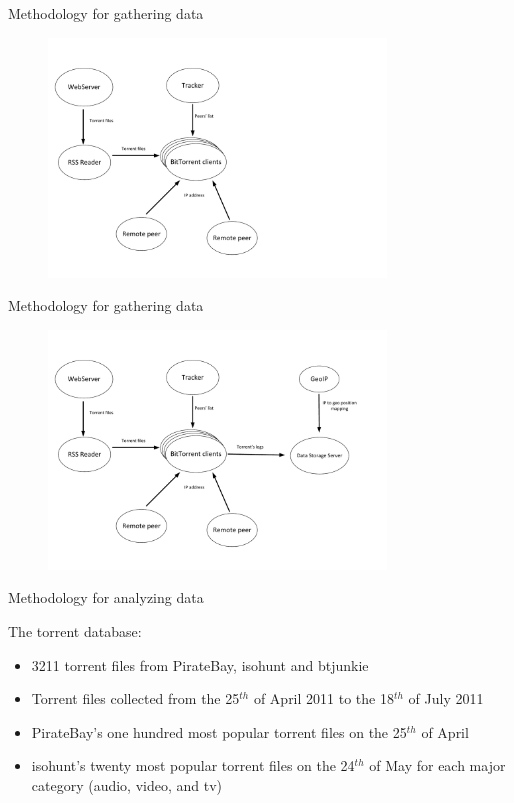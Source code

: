 \documentclass{beamer}
\begin{document}
\begin{frame}{Methodology for gathering data}

\begin{figure}
\includegraphics[height=2.5in]{figures/ArqSimplesV2_3}
\label{fig:5} 
\end{figure}

\end{frame}

\begin{frame}{Methodology for gathering data}

\begin{figure}
\includegraphics[height=2.5in]{figures/ArqSimplesV2}
\label{fig:6} 
\end{figure}

\end{frame}



\begin{frame}{Methodology for analyzing data}

The torrent database:
\begin{itemize}
\addtolength{\itemsep}{1\baselineskip}
\item
   3211 torrent files from PirateBay, isohunt and btjunkie
\item
   Torrent files collected from the 25$^{th}$ of April 2011 to the 18$^{th}$ of July 2011
\item
   PirateBay's one hundred most popular torrent files on the 25$^{th}$ of April
\item
   isohunt's twenty most popular torrent files on the 24$^{th}$ of May for each major category (audio, video, and tv)
\end{itemize}
\end{frame}
\end{document}
